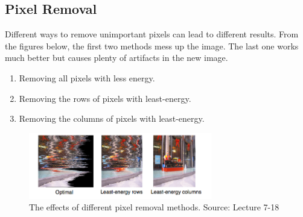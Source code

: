 \documentclass{article}
\begin{document}
\subsection{Pixel Removal}
Different ways to remove unimportant pixels can lead to different results. From the figures below, the first two methods mess up the image. The last one works much better but causes plenty of artifacts in the new image.
\begin{enumerate}
\item Removing all pixels with less energy.
\item Removing the rows of pixels with least-energy.
\item Removing the columns of pixels with least-energy.
\end{enumerate}
\begin{figure}[H]
\centering
\hspace*{1.2cm}\includegraphics[width=8cm]{Pixel_Removal.png}
\caption{The effects of different pixel removal methods. Source: Lecture 7-18}
\end{figure}
\end{document}
